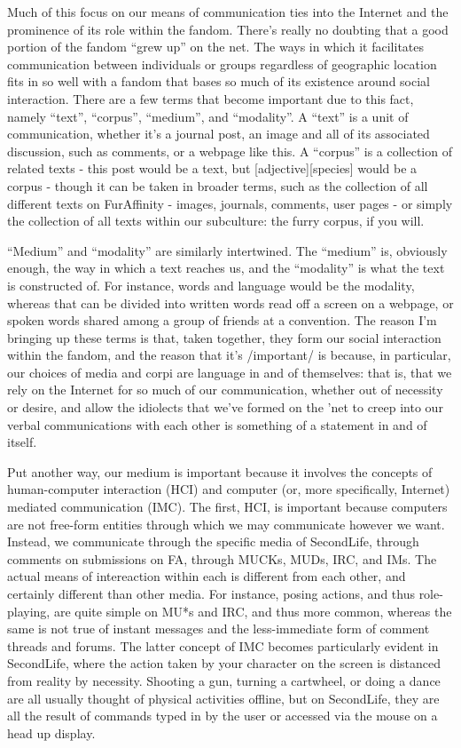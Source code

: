Much of this focus on our means of communication ties into the Internet and the prominence of its role within the fandom. There's really no doubting that a good portion of the fandom ``grew up'' on the net. The ways in which it facilitates communication between individuals or groups regardless of geographic location fits in so well with a fandom that bases so much of its existence around social interaction. There are a few terms that become important due to this fact, namely ``text'', ``corpus'', ``medium'', and ``modality''. A ``text'' is a unit of communication, whether it's a journal post, an image and all of its associated discussion, such as comments, or a webpage like this. A ``corpus'' is a collection of related texts - this post would be a text, but {[}adjective{]}{[}species{]} would be a corpus - though it can be taken in broader terms, such as the collection of all different texts on FurAffinity - images, journals, comments, user pages - or simply the collection of all texts within our subculture: the furry corpus, if you will.

``Medium'' and ``modality'' are similarly intertwined. The ``medium'' is, obviously enough, the way in which a text reaches us, and the ``modality'' is what the text is constructed of. For instance, words and language would be the modality, whereas that can be divided into written words read off a screen on a webpage, or spoken words shared among a group of friends at a convention. The reason I'm bringing up these terms is that, taken together, they form our social interaction within the fandom, and the reason that it's /important/ is because, in particular, our choices of media and corpi are language in and of themselves: that is, that we rely on the Internet for so much of our communication, whether out of necessity or desire, and allow the idiolects that we've formed on the 'net to creep into our verbal communications with each other is something of a statement in and of itself.

Put another way, our medium is important because it involves the concepts of human-computer interaction (HCI) and computer (or, more specifically, Internet) mediated communication (IMC). The first, HCI, is important because computers are not free-form entities through which we may communicate however we want. Instead, we communicate through the specific media of SecondLife, through comments on submissions on FA, through MUCKs, MUDs, IRC, and IMs. The actual means of intereaction within each is different from each other, and certainly different than other media. For instance, posing actions, and thus role-playing, are quite simple on MU*s and IRC, and thus more common, whereas the same is not true of instant messages and the less-immediate form of comment threads and forums. The latter concept of IMC becomes particularly evident in SecondLife, where the action taken by your character on the screen is distanced from reality by necessity. Shooting a gun, turning a cartwheel, or doing a dance are all usually thought of physical activities offline, but on SecondLife, they are all the result of commands typed in by the user or accessed via the mouse on a head up display.

